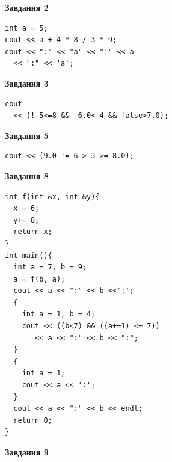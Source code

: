 \documentclass[12pt, ukrainian]{article}
\begin{document}
{\begin {large}
\begin{minipage}[t]{7.0cm}
\end{minipage}
\vline \hspace{1mm}
\begin{minipage}[t]{11.0cm}

\begin{center}
\textbf{Завдання 2}
\end{center}
\vspace{-8mm}

\begin{verbatim}
int a = 5;
cout << a + 4 * 8 / 3 * 9;
cout << ":" << "a" << ":" << a 
  << ":" << 'a';
\end{verbatim}



\begin{center}
\textbf{Завдання 3}
\end{center}
\vspace{-8mm}

\begin{verbatim}
cout 
  << (! 5<=8 &&  6.0< 4 && false>7.0);
\end{verbatim}



\begin{center}
\textbf{Завдання 5}
\end{center}
\vspace{-8mm}

\begin{verbatim}
cout << (9.0 != 6 > 3 >= 8.0);
\end{verbatim}



\begin{center}
\textbf{Завдання 8}
\end{center}
\vspace{-8mm}

\begin{verbatim}
int f(int &x, int &y){
  x = 6;
  y+= 8;
  return x;
}
int main(){
  int a = 7, b = 9;
  a = f(b, a);
  cout << a << ":" << b <<':';
  {
    int a = 1, b = 4;
    cout << ((b<7) && ((a+=1) <= 7))
       << a << ":" << b << ":";
  }
  {
    int a = 1;
    cout << a << ':';
  }
  cout << a << ":" << b << endl;
  return 0;
}
\end{verbatim}

\end{minipage}


\begin{minipage}[t]{7.0cm}

\begin{center}
\textbf{Завдання 9}
\end{center}
\vspace{-8mm}


\end{minipage}
\end{large}}
\end{document}
